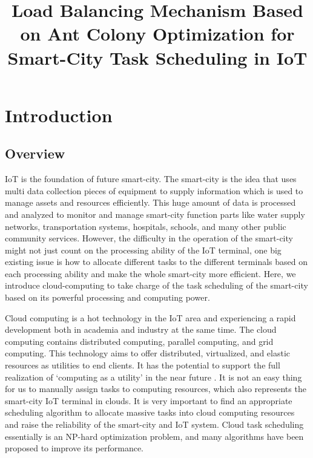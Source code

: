\documentclass[conference]{IEEEtran}
\begin{document}
\title{Load Balancing Mechanism Based on Ant Colony Optimization for Smart-City Task Scheduling in IoT\\
{
}
}

\author{
\and
{}
}

\maketitle

\section{Introduction}
\subsection{Overview}
IoT is the foundation of future smart-city. The smart-city is the idea that uses multi data collection pieces of equipment to supply information which is used to manage assets and resources efficiently. This huge amount of data is processed and analyzed to monitor and manage smart-city function parts like water supply networks, transportation systems, hospitals, schools, and many other public community services. However, the difficulty in the operation of the smart-city might not just count on the processing ability of the IoT terminal, one big existing issue is how to allocate different tasks to the different terminals based on each processing ability and make the whole smart-city more efficient. Here, we introduce cloud-computing to take charge of the task scheduling of the smart-city based on its powerful processing and computing power.

Cloud computing is a hot technology in the IoT area and experiencing a rapid development both in academia and industry at the same time. The cloud computing contains distributed computing, parallel computing, and grid computing. This technology aims to offer distributed, virtualized, and elastic resources as utilities to end clients. It has the potential to support the full realization of ‘computing as a utility’ in the near future \cite{b1}. It is not an easy thing for us to manually assign tasks to computing resources\cite{b2}\cite{b3}, which also represents the smart-city IoT terminal in clouds. It is very important to find an appropriate scheduling algorithm to allocate massive tasks into cloud computing resources and raise the reliability of the smart-city and IoT system. Cloud task scheduling essentially is an NP-hard optimization problem, and many algorithms have been proposed to improve its performance.
\end{document}
